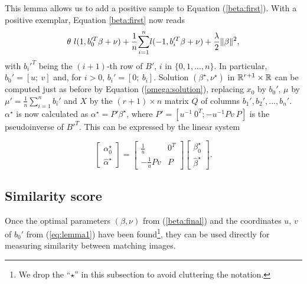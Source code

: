 This lemma allows us to add a positive sample to Equation (\ref{beta:first}).
With a positive exemplar, Equation \ref{beta:first} now reads
\begin{align}
 \theta\ l(1, b_0'^T\beta+\nu) +\dfrac{1}{n}\displaystyle{\sum_{i=1}^n} l(-1,b_i'^T\beta+\nu)
+\dfrac{\lambda}{2}\|\beta\|^2,\label{beta:final}
\end{align}
with $b_i'^T$ being the $(i+1)$-th row of $B'$, $i$ in $\{0,1,...,n\}$. In particular, $b_0'=[u; \ v]$ and, for $i>0$, $b_i'=[0; \ b_i]$. Solution $(\beta^\star,\nu^\star)$ in $\mathbb R^{r+1}\times\mathbb R$ can be computed just as before by Equation (\ref{omega:solution}), replacing $x_0$ by $b_0'$, $\mu$ by $\mu' = \frac{1}{n}\sum_{i=1}^n b_i'$ and $X$ by the $(r+1)\times n$ matrix $Q$ of columns $b_1', b_2',...,b_n'$. $\alpha^\star$ is now calculated as
$\alpha^\star=P'\beta^\star$, where $P' = [u^{-1} \ 0^T; -u^{-1}Pv \ P]$ is the pseudoinverse of $B'^T$. This can be expressed by the linear system

\begin{equation}
\begin{bmatrix} \alpha_0^\star \\ \hat{\alpha}^\star \end{bmatrix} = \begin{bmatrix} \frac{1}{u} & 0^T \\-\frac{1}{u}Pv & P  \end{bmatrix} \begin{bmatrix}\beta_0^\star \\ \hat{\beta}^\star \end{bmatrix}.\label{alpha:to:beta}
\end{equation}

\subsection{Similarity score}\label{simi_score}
Once the optimal parameters $(\beta, \nu)$ from (\ref{beta:final}) and the coordinates $u$, $v$ of $b_0'$ from (\ref{eq:lemma1}) have been found\footnote{We drop the ``$\star$'' in this subsection to avoid cluttering the notation.}, they can be used directly for measuring similarity between matching images.

